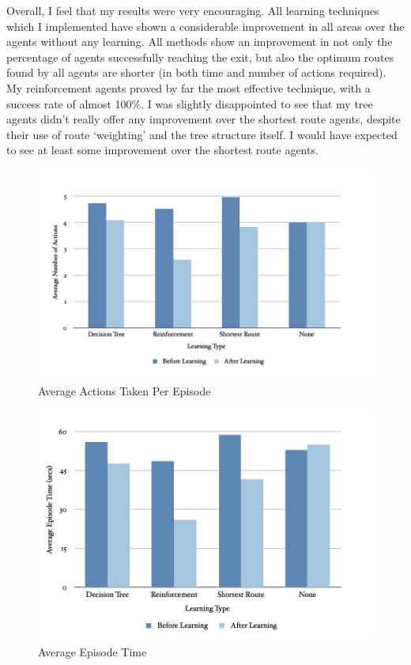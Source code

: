 \documentclass[a4paper,oneside]{report}
\begin{document}
Overall, I feel that my results were very encouraging. All learning techniques which I implemented have shown a considerable improvement in all areas over the agents without any learning. All methods show an improvement in not only the percentage of agents successfully reaching the exit, but also the optimum routes found by all agents are shorter (in both time and number of actions required). My reinforcement agents proved by far the most effective technique, with a success rate of almost 100\%. I was slightly disappointed to see that my tree agents didn't really offer any improvement over the shortest route agents, despite their use of route `weighting' and the tree structure itself. I would have expected to see at least some improvement over the shortest route agents.
\newpage

\begin{figure}[H]
  \centering
    \includegraphics[width=130mm]{sources/images/AvgActions}
    \caption{Average Actions Taken Per Episode}
    \label{fig:AvgActions}
\end{figure}

\begin{figure}[H]
  \centering
    \includegraphics[width=130mm]{sources/images/AvgEpisode}
    \caption{Average Episode Time}
    \label{fig:AvgTime}
\end{figure}
\end{document}
